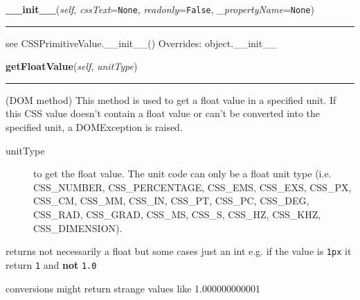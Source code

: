 \hspace{.8\funcindent}\begin{boxedminipage}{\funcwidth}

    \raggedright \textbf{\_\_init\_\_}(\textit{self}, \textit{cssText}={\tt None}, \textit{readonly}={\tt False}, \textit{\_propertyName}={\tt None})

    \vspace{-1.5ex}

    \rule{\textwidth}{0.5\fboxrule}
\setlength{\parskip}{2ex}

see CSSPrimitiveValue.{\_}{\_}init{\_}{\_}()
\setlength{\parskip}{1ex}
      Overrides: object.\_\_init\_\_

    \end{boxedminipage}

    \label{cssutils:css:cssvalue:CSSPrimitiveValue:getFloatValue}

    \vspace{0.5ex}

\hspace{.8\funcindent}\begin{boxedminipage}{\funcwidth}

    \raggedright \textbf{getFloatValue}(\textit{self}, \textit{unitType})

    \vspace{-1.5ex}

    \rule{\textwidth}{0.5\fboxrule}
\setlength{\parskip}{2ex}

(DOM method) This method is used to get a float value in a
specified unit. If this CSS value doesn't contain a float value
or can't be converted into the specified unit, a DOMException
is raised.
\begin{description}
\item[{unitType}] \leavevmode 
to get the float value. The unit code can only be a float unit type
(i.e. CSS{\_}NUMBER, CSS{\_}PERCENTAGE, CSS{\_}EMS, CSS{\_}EXS, CSS{\_}PX, CSS{\_}CM,
CSS{\_}MM, CSS{\_}IN, CSS{\_}PT, CSS{\_}PC, CSS{\_}DEG, CSS{\_}RAD, CSS{\_}GRAD, CSS{\_}MS,
CSS{\_}S, CSS{\_}HZ, CSS{\_}KHZ, CSS{\_}DIMENSION).

\end{description}

returns not necessarily a float but some cases just an int
e.g. if the value is \texttt{1px} it return \texttt{1} and \textbf{not} \texttt{1.0}

conversions might return strange values like 1.000000000001
\setlength{\parskip}{1ex}
    \end{boxedminipage}

